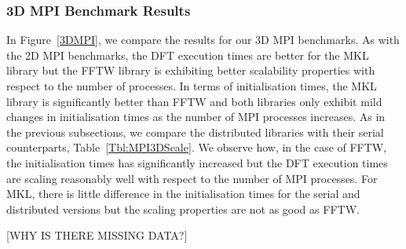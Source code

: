 \documentclass[12pt, a4paper]{article} \setlength{\textheight}{24cm}
\begin{document}
\subsubsection{3D MPI Benchmark Results}
In Figure~\ref{3DMPI}, we compare the results for our 3D MPI
benchmarks. As with the 2D MPI benchmarks, the DFT execution times are
better for the MKL library but the FFTW library is exhibiting better
scalability properties with respect to the number of processes. In
terms of initialisation times, the MKL library is significantly better
than FFTW and both libraries only exhibit mild changes in
initialisation times as the number of MPI processes increases. As in
the previous subsections, we compare the distributed libraries with
their serial counterparts, Table~\ref{Tbl:MPI3DScale}. We observe how,
in the case of FFTW, the initialisation times has significantly
increased but the DFT execution times are scaling reasonably well with
respect to the number of MPI processes. For MKL, there is little
difference in the initialisation times for the serial and distributed
versions but the scaling properties are not as good as FFTW.

[WHY IS THERE MISSING DATA?]
\end{document}
